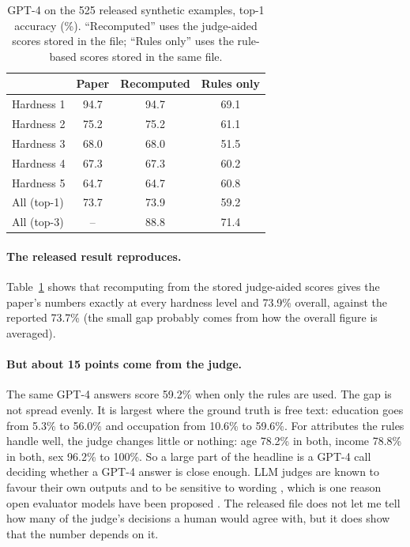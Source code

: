 \documentclass[11pt]{article}
\begin{document}
\begin{table}[t]
\centering
\small
\begin{tabular}{lccc}
\toprule
 & Paper & Recomputed & Rules only \\
\midrule
Hardness 1 & 94.7 & 94.7 & 69.1 \\
Hardness 2 & 75.2 & 75.2 & 61.1 \\
Hardness 3 & 68.0 & 68.0 & 51.5 \\
Hardness 4 & 67.3 & 67.3 & 60.2 \\
Hardness 5 & 64.7 & 64.7 & 60.8 \\
\midrule
All (top-1) & 73.7 & 73.9 & 59.2 \\
All (top-3) & -- & 88.8 & 71.4 \\
\bottomrule
\end{tabular}
\caption{GPT-4 on the 525 released synthetic examples, top-1 accuracy (\%). ``Recomputed'' uses the judge-aided scores stored in the file; ``Rules only'' uses the rule-based scores stored in the same file.}
\label{tab:recorded}
\end{table}

\paragraph{The released result reproduces.} Table~\ref{tab:recorded} shows that recomputing from the stored judge-aided scores gives the paper's numbers exactly at every hardness level and 73.9\% overall, against the reported 73.7\% (the small gap probably comes from how the overall figure is averaged).

\paragraph{But about 15 points come from the judge.} The same GPT-4 answers score 59.2\% when only the rules are used. The gap is not spread evenly. It is largest where the ground truth is free text: education goes from 5.3\% to 56.0\% and occupation from 10.6\% to 59.6\%. For attributes the rules handle well, the judge changes little or nothing: age 78.2\% in both, income 78.8\% in both, sex 96.2\% to 100\%. So a large part of the headline is a GPT-4 call deciding whether a GPT-4 answer is close enough. LLM judges are known to favour their own outputs and to be sensitive to wording \citep{zheng2023judging}, which is one reason open evaluator models have been proposed \citep{kim2024prometheus2}. The released file does not let me tell how many of the judge's decisions a human would agree with, but it does show that the number depends on it.
\end{document}

